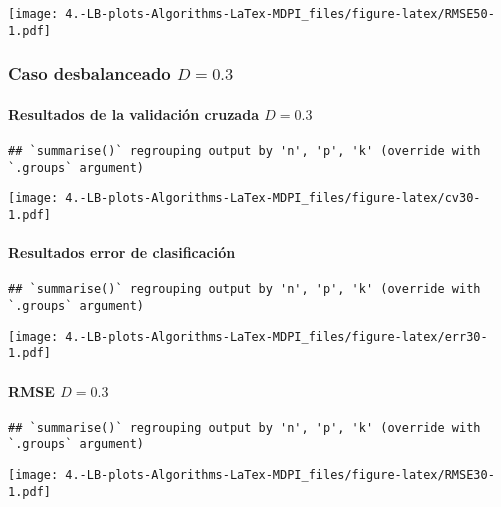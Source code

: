 \documentclass[
]{article}
\begin{document}
\texttt{[image: 4.-LB-plots-Algorithms-LaTex-MDPI\_files/figure-latex/RMSE50-1.pdf]}

\hypertarget{caso-desbalanceado-d0.3}{%
\subsubsection{\texorpdfstring{Caso desbalanceado
\(D=0.3\)}{Caso desbalanceado D=0.3}}\label{caso-desbalanceado-d0.3}}

\hypertarget{resultados-de-la-validaciuxf3n-cruzada-d0.3}{%
\paragraph{\texorpdfstring{Resultados de la validación cruzada
\(D=0.3\)}{Resultados de la validación cruzada D=0.3}}\label{resultados-de-la-validaciuxf3n-cruzada-d0.3}}

\begin{verbatim}
## `summarise()` regrouping output by 'n', 'p', 'k' (override with `.groups` argument)
\end{verbatim}

\texttt{[image: 4.-LB-plots-Algorithms-LaTex-MDPI\_files/figure-latex/cv30-1.pdf]}

\hypertarget{resultados-error-de-clasificaciuxf3n-1}{%
\paragraph{Resultados error de
clasificación}\label{resultados-error-de-clasificaciuxf3n-1}}

\begin{verbatim}
## `summarise()` regrouping output by 'n', 'p', 'k' (override with `.groups` argument)
\end{verbatim}

\texttt{[image: 4.-LB-plots-Algorithms-LaTex-MDPI\_files/figure-latex/err30-1.pdf]}

\hypertarget{rmse-d0.3}{%
\paragraph{\texorpdfstring{RMSE
\(D=0.3\)}{RMSE D=0.3}}\label{rmse-d0.3}}

\begin{verbatim}
## `summarise()` regrouping output by 'n', 'p', 'k' (override with `.groups` argument)
\end{verbatim}

\texttt{[image: 4.-LB-plots-Algorithms-LaTex-MDPI\_files/figure-latex/RMSE30-1.pdf]}
\end{document}
